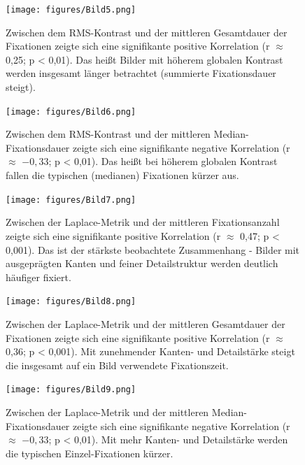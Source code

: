 \documentclass[
    language=german, %
    thesis=seminar, %
    supervisor=postdoc, %
    multiauthor=true, %
    ]{settings/csssa-thesis}
\begin{document}
\begin{figure}[h]
    \centering
    \texttt{[image: figures/Bild5.png]}
    \caption{ Zwischen dem RMS-Kontrast und der mittleren Gesamtdauer der Fixationen zeigte sich eine signifikante positive Korrelation (r $\approx$ 0,25; p < 0,01). Das heißt Bilder mit höherem globalen Kontrast werden insgesamt länger betrachtet (summierte Fixationsdauer steigt).
}\label{fig:bild5}
\end{figure}
\begin{figure}[h]
    \centering
    \texttt{[image: figures/Bild6.png]}
    \caption{ Zwischen dem RMS-Kontrast und der mittleren Median-Fixationsdauer zeigte sich eine signifikante negative Korrelation (r $\approx$ $-0,33$; p < 0,01). Das heißt bei höherem globalen Kontrast fallen die typischen (medianen) Fixationen kürzer aus.
 }\label{fig:bild6}
\end{figure}
\begin{figure}[h]
    \centering
    \texttt{[image: figures/Bild7.png]}
    \caption{Zwischen der Laplace-Metrik und der mittleren Fixationsanzahl zeigte sich eine signifikante positive Korrelation (r $\approx$ 0,47; p < 0,001). Das ist der stärkste beobachtete Zusammenhang - Bilder mit ausgeprägten Kanten und feiner Detailstruktur werden deutlich häufiger fixiert.
 }\label{fig:bild7}
\end{figure}
\begin{figure}[h]
    \centering
    \texttt{[image: figures/Bild8.png]}
    \caption{Zwischen der Laplace-Metrik und der mittleren Gesamtdauer der Fixationen zeigte sich eine signifikante positive Korrelation (r $\approx$ 0,36; p < 0,001). Mit zunehmender Kanten- und Detailstärke steigt die insgesamt auf ein Bild verwendete Fixationszeit.
 }\label{fig:bild8}
\end{figure}
\begin{figure}[h]
    \centering
    \texttt{[image: figures/Bild9.png]}
    \caption{Zwischen der Laplace-Metrik und der mittleren Median-Fixationsdauer zeigte sich eine signifikante negative Korrelation (r $\approx$ $-0,33$; p < 0,01). Mit mehr Kanten- und Detailstärke werden die typischen Einzel-Fixationen kürzer.
  }\label{fig:bild9}
\end{figure}
\end{document}
